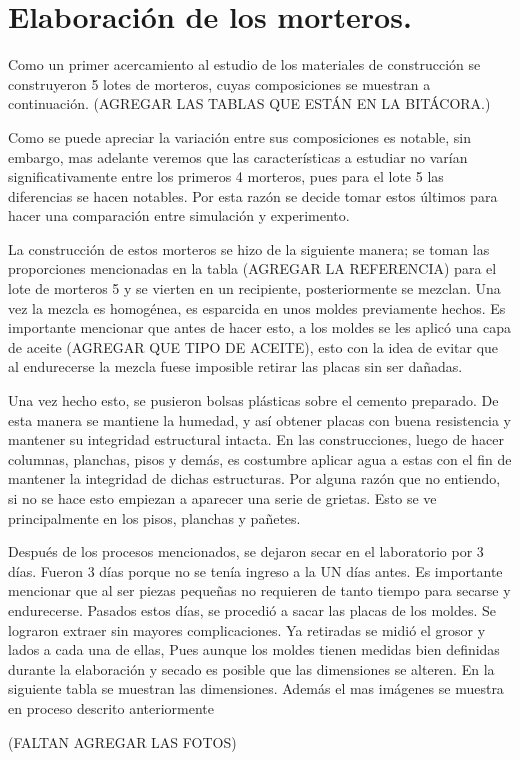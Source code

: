 \chapter{Elaboración de los morteros.}

Como un primer acercamiento al estudio de los materiales de construcción se construyeron 5 lotes de morteros, cuyas composiciones se muestran a continuación. (AGREGAR LAS TABLAS QUE ESTÁN EN LA BITÁCORA.)

Como se puede apreciar la variación entre sus composiciones es notable, sin embargo, mas adelante veremos que las características a estudiar no varían significativamente entre los primeros 4 morteros, pues para el lote 5 las diferencias se hacen notables. Por esta razón se decide tomar estos últimos para hacer una comparación entre simulación y experimento. 

\vspace{5mm}

La construcción de estos morteros se hizo de la siguiente manera; se toman las proporciones mencionadas en la tabla (AGREGAR LA REFERENCIA) para el lote de morteros 5 y se vierten en un recipiente, posteriormente se mezclan. Una vez la mezcla es homogénea, es esparcida en unos moldes previamente hechos. Es importante mencionar que antes de hacer esto, a los moldes se les aplicó una capa de aceite (AGREGAR QUE TIPO DE ACEITE), esto con la idea de evitar que al endurecerse la mezcla fuese imposible retirar las placas sin ser dañadas.

\vspace{5mm}

Una vez hecho esto, se pusieron bolsas plásticas sobre el cemento preparado. De esta manera se mantiene la humedad, y así obtener placas con buena resistencia y mantener su integridad estructural intacta. En las construcciones, luego de hacer columnas, planchas, pisos y demás, es costumbre aplicar agua a estas con el fin de mantener la integridad de dichas estructuras. Por alguna razón que no entiendo, si no se hace esto empiezan a aparecer una serie de grietas. Esto se ve principalmente en los pisos, planchas y pañetes. 


\vspace{5mm}

Después de los procesos mencionados, se dejaron secar en el laboratorio por 3 días. Fueron 3 días porque no se tenía ingreso a la UN días antes. Es importante mencionar que al ser piezas pequeñas no requieren de tanto tiempo para secarse y endurecerse. Pasados estos días, se procedió a sacar las placas de los moldes. Se lograron extraer sin mayores complicaciones. 
Ya retiradas se midió el grosor y lados a cada una de ellas, Pues aunque los moldes tienen medidas bien definidas durante la elaboración y secado es posible que las dimensiones se alteren. En la siguiente tabla se muestran las dimensiones. Además el mas imágenes se muestra en proceso descrito anteriormente 

(FALTAN AGREGAR LAS FOTOS)